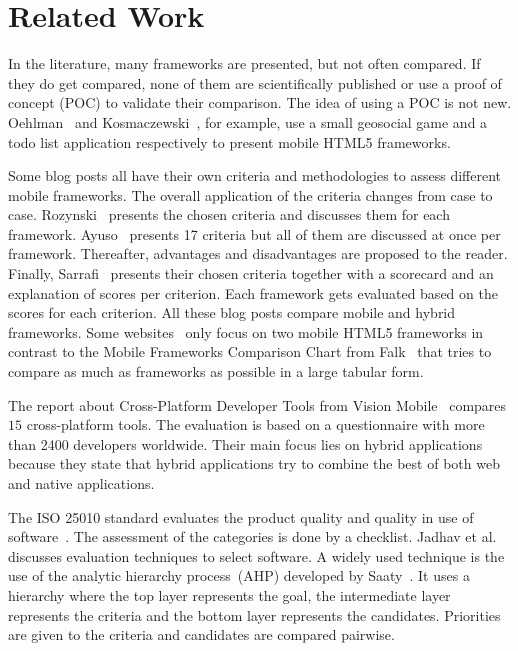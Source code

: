 \documentclass[a4paper]{artikel3}
\begin{document}
\section{Related Work} %
\label{sec:related-work}

In the literature, many frameworks are presented, but not often compared.
If they do get compared, none of them are scientifically published or use a proof of concept (POC) to validate their comparison.  
The idea of using a POC is not new.  
Oehlman~\cite{Oeflman2011} and Kosmaczewski~\cite{Kosmaczewski2012},  for example,  use a small geosocial game and a todo list application respectively to present mobile HTML5 frameworks.

Some blog posts \cite{Sarrafi2012a,Ayuso2012,Rozynski2011} all have their own criteria and methodologies to assess different mobile frameworks.  
The overall application of the criteria changes from case to case.  
Rozynski~\cite{Rozynski2011} presents the chosen criteria and discusses them for each framework.  
Ayuso~\cite{Ayuso2012} presents 17 criteria but all of them are discussed at once per framework.  
Thereafter,  advantages and disadvantages are proposed to the reader.  
Finally, Sarrafi~\cite{Sarrafi2012a} presents their chosen criteria together with a scorecard and an explanation of scores per criterion.  
Each framework gets evaluated based on the scores for each criterion.
All these blog posts compare mobile and hybrid frameworks.  
Some websites~\cite{Bristowe2012,Burris} only focus on two mobile HTML5 frameworks in contrast to the Mobile Frameworks Comparison Chart from Falk~\cite{Falk2011} that tries to compare as much as frameworks as possible in a large tabular form.

The report about Cross-Platform Developer Tools from Vision Mobile~\cite{Mobile2012} compares $15$ cross-platform tools.
The evaluation is based on a questionnaire with more than 2400 developers worldwide.
Their main focus lies on hybrid applications because they state that hybrid applications try to combine the best of both web and native applications.

The ISO 25010 standard evaluates the product quality and quality in use of software~\cite{Standard2010}.
The assessment of the categories is done by a checklist. 
Jadhav et al.~\cite{Jadhav2009} discusses evaluation techniques to select software.
A widely used technique is the use of the analytic hierarchy process~(AHP) developed by Saaty~\cite{Saaty1980}.
It uses a hierarchy where the top layer represents the goal, the intermediate layer represents the criteria and the bottom layer represents the candidates.
Priorities are given to the criteria and candidates are compared pairwise.
\end{document}
